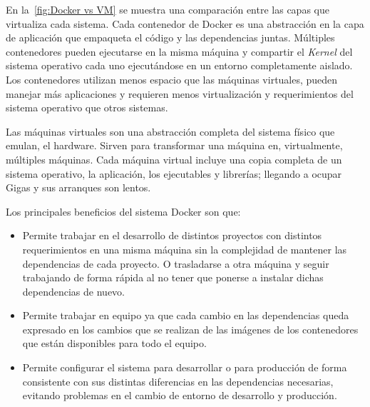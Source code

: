 En la~\cref{fig:Docker vs VM} se muestra una comparación entre las capas que virtualiza cada sistema.
Cada contenedor de Docker es una abstracción en la capa de aplicación que empaqueta el código y las dependencias juntas.
Múltiples contenedores pueden ejecutarse en la misma máquina y compartir el \textit{Kernel} del sistema operativo cada uno ejecutándose en un entorno completamente aislado.
Los contenedores utilizan menos espacio que las máquinas virtuales, pueden manejar más aplicaciones y requieren menos virtualización y requerimientos del sistema operativo que otros sistemas.

Las máquinas virtuales son una abstracción completa del sistema físico que emulan, el hardware.
Sirven para transformar una máquina en, virtualmente, múltiples máquinas.
Cada máquina virtual incluye una copia completa de un sistema operativo, la aplicación, los ejecutables y librerías;
llegando a ocupar Gigas y sus arranques son lentos.

Los principales beneficios del sistema Docker son que:
\begin{itemize}
    \item Permite trabajar en el desarrollo de distintos proyectos con distintos requerimientos en una misma máquina sin la complejidad de mantener las dependencias de cada proyecto.
    O trasladarse a otra máquina y seguir trabajando de forma rápida al no tener que ponerse a instalar dichas dependencias de nuevo.
    \item Permite trabajar en equipo ya que cada cambio en las dependencias queda expresado en los cambios que se realizan de las imágenes de los contenedores que están disponibles para todo el equipo.
    \item Permite configurar el sistema para desarrollar o para producción de forma consistente con sus distintas diferencias en las dependencias necesarias, evitando problemas en el cambio de entorno de desarrollo y producción.
\end{itemize}